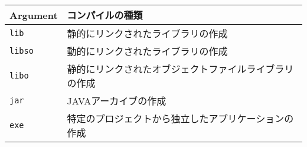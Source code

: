 \begin{tabular}{ll}
 Argument & コンパイルの種類 \\
 \hline
 \texttt{lib} & 静的にリンクされたライブラリの作成 \\
 \texttt{libso} & 動的にリンクされたライブラリの作成 \\
 \texttt{libo} & 静的にリンクされたオブジェクトファイルライブラリの作成 \\
 \texttt{jar} & JAVAアーカイブの作成 \\
 \texttt{exe} & 特定のプロジェクトから独立したアプリケーションの作成 \\
 \hline
\end{tabular}
